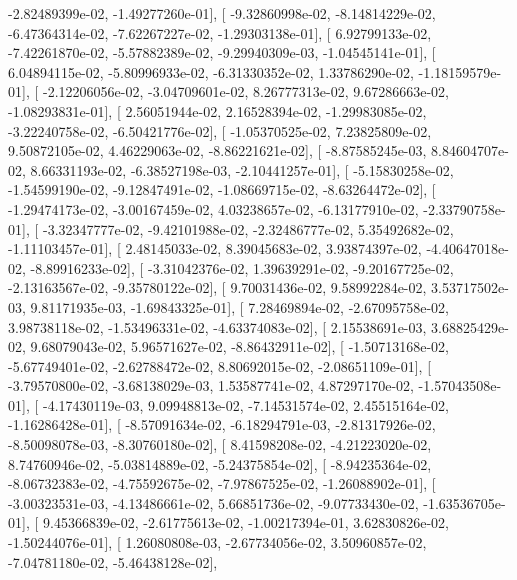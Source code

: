\documentclass{article}
\begin{document}
         -2.82489399e-02,  -1.49277260e-01],
       [ -9.32860998e-02,  -8.14814229e-02,  -6.47364314e-02,
         -7.62267227e-02,  -1.29303138e-01],
       [  6.92799133e-02,  -7.42261870e-02,  -5.57882389e-02,
         -9.29940309e-03,  -1.04545141e-01],
       [  6.04894115e-02,  -5.80996933e-02,  -6.31330352e-02,
          1.33786290e-02,  -1.18159579e-01],
       [ -2.12206056e-02,  -3.04709601e-02,   8.26777313e-02,
          9.67286663e-02,  -1.08293831e-01],
       [  2.56051944e-02,   2.16528394e-02,  -1.29983085e-02,
         -3.22240758e-02,  -6.50421776e-02],
       [ -1.05370525e-02,   7.23825809e-02,   9.50872105e-02,
          4.46229063e-02,  -8.86221621e-02],
       [ -8.87585245e-03,   8.84604707e-02,   8.66331193e-02,
         -6.38527198e-03,  -2.10441257e-01],
       [ -5.15830258e-02,  -1.54599190e-02,  -9.12847491e-02,
         -1.08669715e-02,  -8.63264472e-02],
       [ -1.29474173e-02,  -3.00167459e-02,   4.03238657e-02,
         -6.13177910e-02,  -2.33790758e-01],
       [ -3.32347777e-02,  -9.42101988e-02,  -2.32486777e-02,
          5.35492682e-02,  -1.11103457e-01],
       [  2.48145033e-02,   8.39045683e-02,   3.93874397e-02,
         -4.40647018e-02,  -8.89916233e-02],
       [ -3.31042376e-02,   1.39639291e-02,  -9.20167725e-02,
         -2.13163567e-02,  -9.35780122e-02],
       [  9.70031436e-02,   9.58992284e-02,   3.53717502e-03,
          9.81171935e-03,  -1.69843325e-01],
       [  7.28469894e-02,  -2.67095758e-02,   3.98738118e-02,
         -1.53496331e-02,  -4.63374083e-02],
       [  2.15538691e-03,   3.68825429e-02,   9.68079043e-02,
          5.96571627e-02,  -8.86432911e-02],
       [ -1.50713168e-02,  -5.67749401e-02,  -2.62788472e-02,
          8.80692015e-02,  -2.08651109e-01],
       [ -3.79570800e-02,  -3.68138029e-03,   1.53587741e-02,
          4.87297170e-02,  -1.57043508e-01],
       [ -4.17430119e-03,   9.09948813e-02,  -7.14531574e-02,
          2.45515164e-02,  -1.16286428e-01],
       [ -8.57091634e-02,  -6.18294791e-03,  -2.81317926e-02,
         -8.50098078e-03,  -8.30760180e-02],
       [  8.41598208e-02,  -4.21223020e-02,   8.74760946e-02,
         -5.03814889e-02,  -5.24375854e-02],
       [ -8.94235364e-02,  -8.06732383e-02,  -4.75592675e-02,
         -7.97867525e-02,  -1.26088902e-01],
       [ -3.00323531e-03,  -4.13486661e-02,   5.66851736e-02,
         -9.07733430e-02,  -1.63536705e-01],
       [  9.45366839e-02,  -2.61775613e-02,  -1.00217394e-01,
          3.62830826e-02,  -1.50244076e-01],
       [  1.26080808e-03,  -2.67734056e-02,   3.50960857e-02,
         -7.04781180e-02,  -5.46438128e-02],
\end{document}
